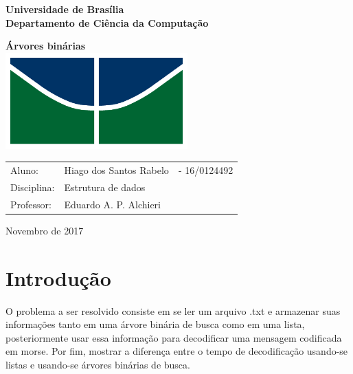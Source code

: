 \documentclass[12 pt, a4paper]{article}
\begin{document}
	\begin{titlepage}
		\begin{center}
			{\large \textbf{Universidade de Bras\'ilia}}\\
			{\large \textbf{Departamento de Ci\^encia da Computa\c{c}\~ao}}\vspace{1.0cm}

			{\Huge \textbf{\'Arvores bin\'arias}}\\[7.0cm]
			\includegraphics[height=10em]{images/CIC_header}\\[6.0cm]

		\end{center}

		\begin{table}[h]
		\begin{tabular}{l lr}
		Aluno:    	%
					& Hiago dos Santos Rabelo&- 16/0124492\\
		Disciplina:	& Estrutura de dados\\
		Professor:	& Eduardo A. P. Alchieri\vspace{1.5cm}\\

		\end{tabular}
		\end{table}


		\center \date[Novembro de 2017
			
	\end{titlepage}

\tableofcontents

\newpage
\section {Introdu\c{c}\~ao}

O problema a ser resolvido consiste em se ler um arquivo .txt e armazenar suas informa\c{c}\~oes tanto em uma \'arvore bin\'aria de busca como em uma lista, posteriormente usar essa informa\c{c}\~ao para decodificar uma mensagem codificada em morse. 
\newline
Por fim, mostrar a diferen\c{c}a entre o tempo de decodifica\c{c}\~ao usando-se listas e usando-se \'arvores bin\'arias de busca.
\end{document}
